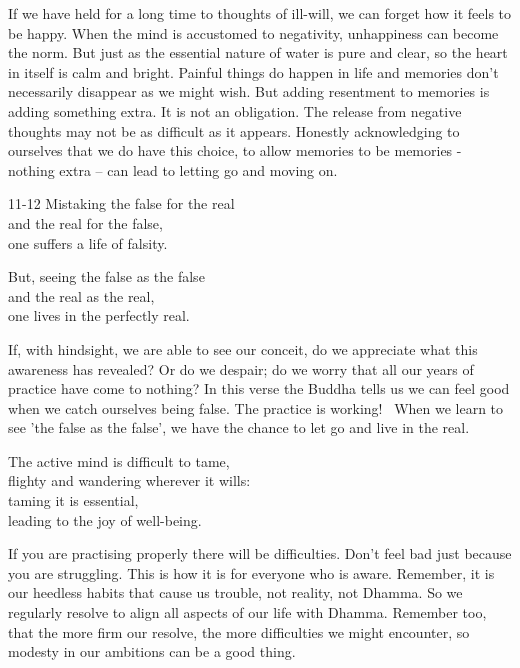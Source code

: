 \begin{dhpRefl}
If we have held for a long time to thoughts of ill-will, we can forget how it feels to be happy. When the mind is accustomed to negativity, unhappiness can become the norm. But just as the essential nature of water is pure and clear, so the heart in itself is calm and bright. Painful things do happen in life and memories don't necessarily disappear as we might wish. But adding resentment to memories is adding something extra. It is not an obligation. The release from negative thoughts may not be as difficult as it appears. Honestly acknowledging to ourselves that we do have this choice, to allow memories to be memories - nothing extra – can lead to letting go and moving on.
\end{dhpRefl}


\begin{dhpVerse}{11-12}
\label{dhp-11}\label{dhp-12}
Mistaking the false for the real\\
and the real for the false,\\
one suffers a life of falsity.

But, seeing the false as the false\\
and the real as the real,\\
one lives in the perfectly real.
\end{dhpVerse}

\begin{dhpRefl}
If, with hindsight, we are able to see our conceit, do we appreciate what this awareness has revealed? Or do we despair; do we worry that all our years of practice have come to nothing? In this verse the Buddha tells us we can feel good when we catch ourselves being false. The practice is working!  When we learn to see 'the false as the false', we have the chance to let go and live in the real.
\end{dhpRefl}


\begin{dhpVerse}{35}
\label{dhp-35}
The active mind is difficult to tame,\\
flighty and wandering wherever it wills:\\
taming it is essential,\\
leading to the joy of well-being.
\end{dhpVerse}

\begin{dhpRefl}
If you are practising properly there will be difficulties. Don't feel bad just because you are struggling. This is how it is for everyone who is aware. Remember, it is our heedless habits that cause us trouble, not reality, not Dhamma. So we regularly resolve to align all aspects of our life with Dhamma. Remember too, that the more firm our resolve, the more difficulties we might encounter, so modesty in our ambitions can be a good thing.
\end{dhpRefl}

